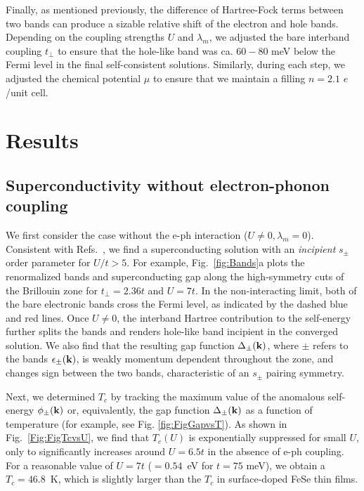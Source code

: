 \documentclass[%
 reprint,
 superscriptaddress,
nofootinbib,
nobibnotes,
 amsmath,amssymb,
 aps,
 prb,
 dvipsnames, 
 floatfix
]{revtex4-2}
\newcommand{\eph}{e-ph}
\begin{document}
Finally, as mentioned previously, the difference of Hartree-Fock terms between two bands can produce a sizable relative shift of the electron and hole bands. Depending on the coupling strengths $U$ and $\lambda_m$, we adjusted the bare interband coupling $t_\perp$ to ensure that the hole-like band was ca. $60-80$ meV below the Fermi level in the final self-consistent solutions. Similarly, during each step, we adjusted the chemical potential $\mu$ to ensure that we maintain a filling $n = 2.1$ $e$/unit cell.



\section{Results}
\label{Sec:Results}
\subsection{Superconductivity without electron-phonon coupling}
We first consider the case without the {\eph} interaction ($U\neq0, \lambda_m =0$). Consistent with Refs.~\cite{Chen:2015dw,Linscheid2016}, we find a superconducting solution with an {\em incipient} $s_\pm$ order parameter for $U/t > 5$. For example, Fig.~\ref{fig:Bands}a plots the renormalized bands and superconducting gap along the high-symmetry cuts of the Brillouin zone for $t_\perp = 2.36t$ and $U = 7t$. In the non-interacting limit, both of the bare electronic bands cross the Fermi level, as indicated by the dashed blue and red lines. Once $U\ne 0$, the interband Hartree contribution to the self-energy further splits the bands and renders hole-like band incipient in the converged solution. We also find that the resulting gap function $\Delta_{\pm}({\bf k})$, where $\pm$ refers to the bands $\epsilon_\pm({\bf k})$, is weakly momentum dependent throughout the zone, and changes sign between the two bands, characteristic of an $s_\pm$ pairing symmetry. 

Next, we determined $T_c$ by tracking the maximum value of the anomalous self-energy $\phi_{\pm}({\bf k})$ or, equivalently, the gap function $\Delta_\pm({\bf k})$ as a function of temperature (for example, see Fig. \ref{fig:FigGapvsT}). As shown in  Fig.~\ref{Fig:FigTcvsU}, we find that $T_c (U)$ is exponentially suppressed for small $U$, only to significantly increases around $U=6.5t$ in the absence of {\eph} coupling. For a reasonable value of $U=7t$ ($=0.54$~eV for $t=75$ meV), we obtain a $T_c = 46.8$~K, which is slightly larger than the $T_c$ in surface-doped FeSe thin films. 
\end{document}
